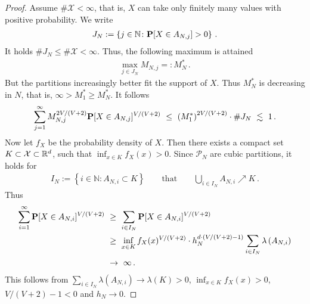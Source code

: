 \begin{proof}
 Assume $\#\mathcal{X}<\infty$, that is, $X$ can take only finitely many values with positive probability.
We write
\begin{gather*}
  J_N
  :=
  \left\{ 
    j\in\mathbb{N}
    \colon
    \P[X\in A_{N,j}]>0
  \right\}
  \,.
\end{gather*}
It holds
$\#J_N\le \# \mathcal{X}<\infty$.
Thus, the following maximum is attained
\begin{gather*}
  \max_{j\in J_N} M_{N,j}
  =:M^*_N
  \,.
\end{gather*}
But the partitions increasingly better fit the support of $X$. Thus
$M^*_N$ is decreasing in $N$, that is,  $\infty>M^*_1\ge M^*_N$.
It follows
\begin{align*}
  \sum_{j=1}^{\infty} 
  M_{N,j}
  ^{2V/(V+2)}
  \P
  [
  X\in A_{N,j}
  ]^{V/(V+2)}
  \ 
  \le
  \ 
  \left( 
  M^*_1
  \right)
  ^{2V/(V+2)}
  \cdot
  \# J_N
  \ 
  \lesssim
  \ 
  1
  \,.
\end{align*}
Now let $f_X$ be the probability density of $X$. 
  Then there exists a compact set $K\subset\mathcal{X}\subset \R^d$, such that
  $
  \inf_{x\in K}f_X(x)
  >0
  $. Since $\mathcal{P}_N$ are cubic partitions, it holds for 
  \begin{gather*}
    I_N
    :=
    \left\{ 
      i\in\mathbb{N}\colon
      A_{N,i}\subset K
    \right\}
    \qquad
    \text{that}
    \qquad
    \bigcup_{i\in I_N}A_{N,i}\nearrow K
    \,.
  \end{gather*}
Thus
\begin{align*}
  \sum_{i=1}^\infty
  \P
  [
  X\in A_{N,i}
  ]^{V/(V+2)}
  &
  \ 
  \ge
  \ 
  \sum_{i\in I_N}
  \P
  [
  X\in A_{N,i}
  ]^{V/(V+2)}
  \\
  &
  \ 
  \ge
  \ 
  \inf_{x\in K}f_X(x)
  ^{V/(V+2)}
  \cdot 
  h_N^{d\cdot(V/(V+2)-1)}
  \sum_{i\in I_N}
  \lambda
  \left( 
  A_{N,i}
  \right)
  \\
  &
  \ 
  \to
  \ 
  \infty
  \,.
\end{align*}
This follows from
$
  \sum_{i\in I_N}
  \lambda
  \left( 
  A_{N,i}
  \right)
  \to 
  \lambda(K)>0
$,
  $
  \inf_{x\in K}f_X(x)
  >0
  $,
  $V/(V+2)-1<0$ and $h_N\to 0$.
\end{proof}

